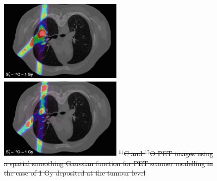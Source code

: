 \documentclass[11pt]{iopart}
\providecommand{\DIFdeltex}[1]{{\protect\color{red}\sout{#1}}}                      %
\providecommand{\DIFaddend}{} %
\providecommand{\DIFdelFL}[1]{\DIFdel{#1}} %
\providecommand{\DIFdelbeginFL}{} %
\providecommand{\DIFdel}[1]{\texorpdfstring{\DIFdeltex{#1}}{}} %
\begin{document}
\DIFaddend \begin{figure}[!h]
  \centering
  \includegraphics[width=6cm,height=40mm]{figures/gaussPET_C11_v1.jpg}
  \includegraphics[width=6cm,height=40mm]{figures/gaussPET_O15_v1.jpg}
  \DIFdelbeginFL %
{%
\DIFdelFL{$^{11}$C and $^{15}$O PET images using a spatial smoothing Gaussian function for PET scanner modelling in the case of 1 Gy deposited at the tumour level}}


\end{figure}
\end{document}
